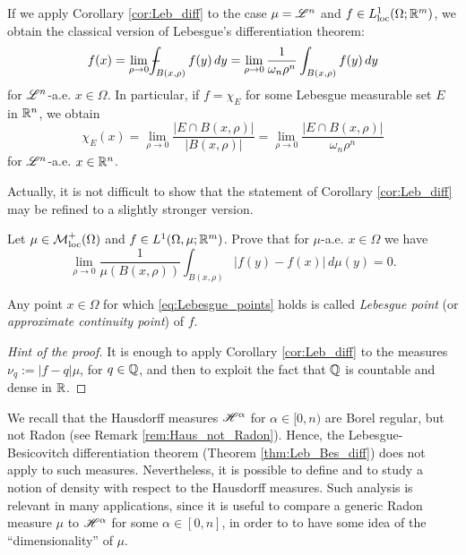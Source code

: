 \begin{remark}
If we apply Corollary \ref{cor:Leb_diff} to the case $\mu = \mathscr{L}^{n}$ and $f \in L^{1}_{\rm loc}(\Omega; \mathbb{R}^{m})$, we obtain the classical version of Lebesgue's differentiation theorem:
\begin{equation*}
f(x) = \lim_{\rho \to 0} -\hspace{-1.13em}\int_{B(x, \rho)} f(y) \, dy = \lim_{\rho \to 0} \frac{1}{\omega_{n} \rho^{n}} \int_{B(x, \rho)} f(y) \, dy
\end{equation*}
for $\mathscr{L}^{n}$-a.e. $x \in \Omega$.
In particular, if $f = \chi_{E}$ for some Lebesgue measurable set $E$ in $\mathbb{R}^{n}$, we obtain
\begin{equation} \label{density_points_set}
\chi_{E}(x) = \lim_{\rho \to 0} \frac{|E \cap B(x, \rho)|}{|B(x, \rho)|} =  \lim_{\rho \to 0} \frac{|E \cap B(x, \rho)|}{\omega_{n} \rho^{n}}
\end{equation}
for $\mathscr{L}^{n}$-a.e. $x \in \mathbb{R}^{n}$.
\end{remark}

Actually, it is not difficult to show that the statement of Corollary \ref{cor:Leb_diff} may be refined to a slightly stronger version.

\begin{corollary}
Let $\mu \in \mathcal{M}^{+}_{\rm loc}(\Omega)$ and $f \in L^{1}(\Omega, \mu; \mathbb{R}^{m})$. Prove that for $\mu$-a.e. $x \in \Omega$ we have
\begin{equation} \label{eq:Lebesgue_points}
\lim_{\rho \to 0} \frac{1}{\mu(B(x, \rho))} \int_{B(x, \rho)}|f(y) - f(x)| \, d \mu(y) = 0.
\end{equation}
\end{corollary}
Any point $x \in \Omega$ for which \eqref{eq:Lebesgue_points} holds is called {\em Lebesgue point} (or {\em approximate continuity point}) of $f$.

\begin{proof}[Hint of the proof]
It is enough to apply Corollary \ref{cor:Leb_diff} to the measures $\nu_{q} := |f - q| \mu$, for $q \in \mathbb{Q}$, and then to exploit the fact that $\mathbb{Q}$ is countable and dense in $\mathbb{R}$.
\end{proof}

We recall that the Hausdorff measures $\mathscr{H}^{\alpha}$ for $\alpha \in [0, n)$ are Borel regular, but not Radon (see Remark \ref{rem:Haus_not_Radon}). Hence, the Lebesgue-Besicovitch differentiation theorem (Theorem \ref{thm:Leb_Bes_diff}) does not apply to such measures. Nevertheless, it is possible to define and to study a notion of density with respect to the Hausdorff measures. Such analysis is relevant in many applications, since it is useful to compare a generic Radon measure $\mu$ to $\mathscr{H}^{\alpha}$ for some $\alpha \in [0, n]$, in order to to have some idea of the ``dimensionality'' of $\mu$.

